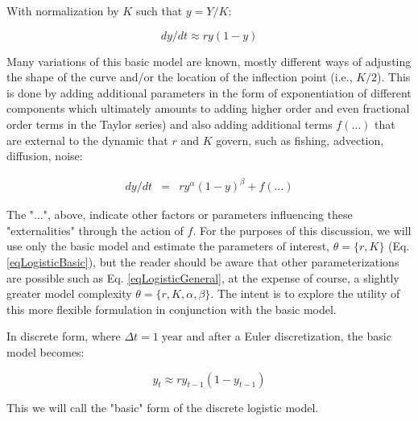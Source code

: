 \documentclass[letterpaper,portrait,11pt]{scrartcl}
\numberwithin{equation}{section}		%
\numberwithin{figure}{section}		%
\numberwithin{table}{section}				%
\begin{document}
\begin{appendices}
With normalization by $K$ such that $ y = Y/K $:

\begin{equation} 
\label{eqLogisticBasic}
dy/dt  \approx  r y (1 - y)
\end{equation}

Many variations of this basic model are known, mostly different ways of adjusting the shape of the curve and/or the location of the inflection point (i.e., $K/2$). This is done by adding additional parameters in the form of exponentiation of different components which ultimately amounts to adding higher order and even fractional order terms in the Taylor series) and also adding additional terms $f(\dots)$ that are external to the dynamic that $r$ and $K$ govern, such as fishing, advection, diffusion, noise: 

\begin{eqnarray} 
\label{eqLogisticGeneral}
dy / dt &=& r y^{\alpha} ( 1 - y )^{\beta} + f(\dots)
\end{eqnarray}

The "$\dots$", above, indicate other factors or parameters influencing these "externalities" through the action of $f$. For the purposes of this discussion, we will use only the basic model and estimate the parameters of interest, $\theta = \{r, K \}$ (Eq. \ref{eqLogisticBasic}), but the reader should be aware that other parameterizations are possible such as Eq. \ref{eqLogisticGeneral}, at the expense of course, a slightly greater model complexity $\theta=\{r,K,\alpha,\beta\}$. The intent is to explore the utility of this more flexible formulation in conjunction with the basic model. 

In discrete form, where $\Delta t = 1 \; \text{year}$ and after a Euler discretization, the basic model becomes:

\begin{equation} 
\label{eqLogisticDiscrete:appendix}
y_t  \approx r y_{t-1} (1 - y_{t-1} )
\end{equation}

This we will call the "basic" form of the discrete logistic model.


\end{appendices}
\end{document}
